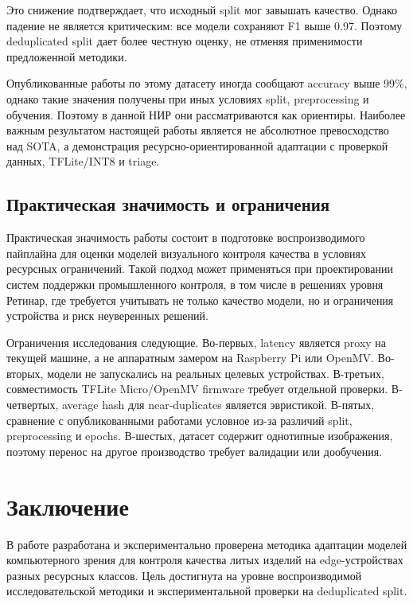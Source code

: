 \documentclass[12pt,a4paper]{article}
\begin{document}
Это снижение подтверждает, что исходный split мог завышать качество. Однако падение не является критическим: все модели сохраняют F1 выше 0.97. Поэтому deduplicated split дает более честную оценку, не отменяя применимости предложенной методики.

Опубликованные работы по этому датасету иногда сообщают accuracy выше 99\%, однако такие значения получены при иных условиях split, preprocessing и обучения. Поэтому в данной НИР они рассматриваются как ориентиры. Наиболее важным результатом настоящей работы является не абсолютное превосходство над SOTA, а демонстрация ресурсно-ориентированной адаптации с проверкой данных, TFLite/INT8 и triage.

\subsection{Практическая значимость и ограничения}

Практическая значимость работы состоит в подготовке воспроизводимого пайплайна для оценки моделей визуального контроля качества в условиях ресурсных ограничений. Такой подход может применяться при проектировании систем поддержки промышленного контроля, в том числе в решениях уровня Ретинар, где требуется учитывать не только качество модели, но и ограничения устройства и риск неуверенных решений.

Ограничения исследования следующие. Во-первых, latency является proxy на текущей машине, а не аппаратным замером на Raspberry Pi или OpenMV. Во-вторых, модели не запускались на реальных целевых устройствах. В-третьих, совместимость TFLite Micro/OpenMV firmware требует отдельной проверки. В-четвертых, average hash для near-duplicates является эвристикой. В-пятых, сравнение с опубликованными работами условное из-за различий split, preprocessing и epochs. В-шестых, датасет содержит однотипные изображения, поэтому перенос на другое производство требует валидации или дообучения.

\section*{Заключение}

В работе разработана и экспериментально проверена методика адаптации моделей компьютерного зрения для контроля качества литых изделий на edge-устройствах разных ресурсных классов. Цель достигнута на уровне воспроизводимой исследовательской методики и экспериментальной проверки на deduplicated split.
\end{document}
